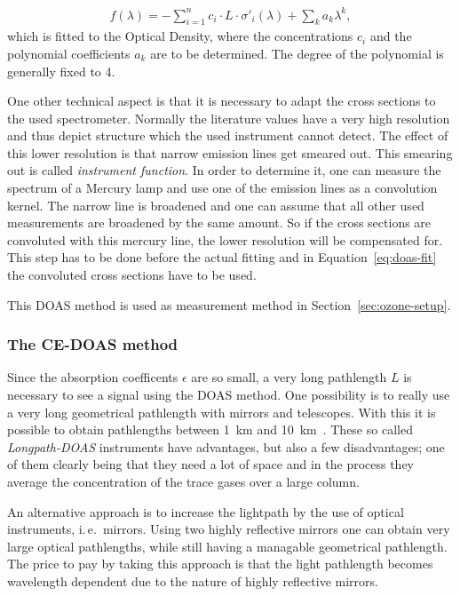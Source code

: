 \begin{align}
  f(\lambda) = - \sum_{i=1}^n c_i \cdot L \cdot \sigma'_i(\lambda) +
  \sum_k a_k \lambda^k \label{eq:doas-fit},
\end{align}
which is fitted to the Optical Density, where the concentrations $c_i$
and the polynomial coefficients $a_k$ are to be determined. The degree
of the polynomial is generally fixed to \num{4}.

One other technical aspect is that it is necessary to adapt the cross
sections to the used spectrometer. Normally the literature values have
a very high resolution and thus depict structure which the used
instrument cannot detect. The effect of this lower resolution is
that narrow emission lines get smeared out. This smearing out is
called \emph{instrument function}. In order to determine it, one can measure the
spectrum of a Mercury lamp and use one of the emission lines as a
convolution kernel. The narrow line is broadened and one can assume
that all other used measurements are broadened by the same amount. So
if the cross sections are convoluted with this mercury line, the lower
resolution will be compensated for. This step has to be done before
the actual fitting and in Equation~\eqref{eq:doas-fit} the convoluted
cross sections have to be used.

This DOAS method is used as measurement method in
Section~\ref{sec:ozone-setup}. 

\subsubsection{The CE-DOAS method}
\label{sec:ce-doas}

Since the absorption coefficents $\epsilon$ are so small, a very long
pathlength $L$ is necessary to see a signal using the DOAS method. One
possibility is to really use a very long geometrical pathlength with
mirrors and telescopes. With this it is possible to obtain pathlengths
between \SI{1}{\kilo\meter} and
\SI{10}{\kilo\meter}~\cite{platt}. These so called
\emph{Longpath-DOAS} instruments have advantages, but also a few
disadvantages; one of them clearly being that they need a lot of space
and in the process they average the concentration of the trace gases
over a large column.

An alternative approach is to increase the lightpath by the use of
optical instruments, i.\,e.\ mirrors. Using two highly reflective
mirrors one can obtain very large optical pathlengths, while still
having a managable geometrical pathlength. The price to pay by
taking this approach is that the light pathlength becomes
wavelength dependent due to the nature of highly reflective mirrors.


